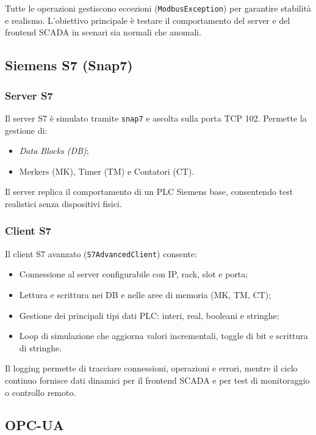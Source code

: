 Tutte le operazioni gestiscono eccezioni (\texttt{ModbusException}) per garantire stabilità e realismo.  
L’obiettivo principale è testare il comportamento del server e del frontend SCADA in scenari sia normali che anomali.

\subsection{Siemens S7 (Snap7)}

\subsubsection{Server S7}

Il server S7 è simulato tramite \texttt{snap7} e ascolta sulla porta TCP 102.  
Permette la gestione di:

\begin{itemize}
    \item \textit{Data Blocks (DB)};
    \item Merkers (MK), Timer (TM) e Contatori (CT).
\end{itemize}

Il server replica il comportamento di un PLC Siemens base, consentendo test realistici senza dispositivi fisici.

\subsubsection{Client S7}

Il client S7 avanzato (\texttt{S7AdvancedClient}) consente:

\begin{itemize}
    \item Connessione al server configurabile con IP, rack, slot e porta;
    \item Lettura e scrittura nei DB e nelle aree di memoria (MK, TM, CT);
    \item Gestione dei principali tipi dati PLC: interi, real, booleani e stringhe;
    \item Loop di simulazione che aggiorna valori incrementali, toggle di bit e scrittura di stringhe.
\end{itemize}

Il logging permette di tracciare connessioni, operazioni e errori, mentre il ciclo continuo fornisce dati dinamici per il frontend SCADA e per test di monitoraggio o controllo remoto.

\subsection{OPC-UA}

